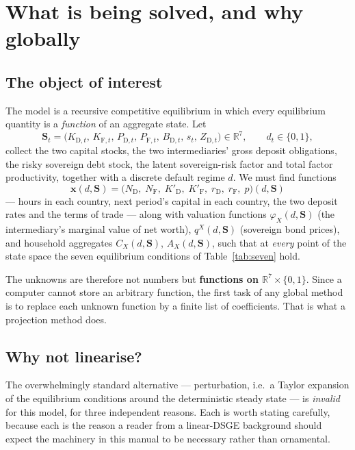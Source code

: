 \documentclass[11pt]{article}
\numberwithin{equation}{section}
\newcommand{\R}{\mathbb{R}}
\newcommand{\D}{\mathrm{D}}
\newcommand{\F}{\mathrm{F}}
\newcommand{\bx}{\mathbf{x}}
\newcommand{\bS}{\mathbf{S}}
\theoremstyle{definition}
\theoremstyle{plain}
\theoremstyle{remark}
\begin{document}
\section{What is being solved, and why globally}

\subsection{The object of interest}

The model is a recursive competitive equilibrium in which every equilibrium quantity
is a \emph{function} of an aggregate state. Let
\begin{equation}
\bS_t=\bigl(K_{\D,t},\,K_{\F,t},\,P_{\D,t},\,P_{\F,t},\,B_{\D,t},\,s_t,\,Z_{\D,t}\bigr)\in\R^{7},
\qquad d_t\in\{0,1\},
\label{eq:state}
\end{equation}
collect the two capital stocks, the two intermediaries' gross deposit obligations,
the risky sovereign debt stock, the latent sovereign-risk factor and total factor
productivity, together with a discrete default regime $d$. We must find functions
\begin{equation}
\bx(d,\bS)=\bigl(N_\D,\;N_\F,\;K'_\D,\;K'_\F,\;r_\D,\;r_\F,\;p\bigr)(d,\bS)
\label{eq:policy-vector}
\end{equation}
--- hours in each country, next period's capital in each country, the two deposit
rates and the terms of trade --- along with valuation functions
$\varphi_X(d,\bS)$ (the intermediary's marginal value of net worth), $q^{X}(d,\bS)$
(sovereign bond prices), and household aggregates $C_X(d,\bS)$, $A_X(d,\bS)$, such
that at \emph{every} point of the state space the seven equilibrium conditions of
Table~\ref{tab:seven} hold.

The unknowns are therefore not numbers but \textbf{functions on $\R^{7}\times\{0,1\}$}.
Since a computer cannot store an arbitrary function, the first task of any global
method is to replace each unknown function by a finite list of coefficients. That is
what a projection method does.

\subsection{Why not linearise?}

The overwhelmingly standard alternative --- perturbation, i.e.\ a Taylor expansion of
the equilibrium conditions around the deterministic steady state --- is
\emph{invalid} for this model, for three independent reasons. Each is worth stating
carefully, because each is the reason a reader from a linear-DSGE background should
expect the machinery in this manual to be necessary rather than ornamental.
\end{document}

